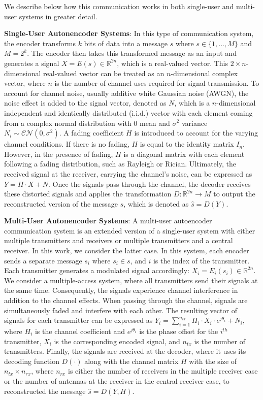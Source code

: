 We describe below how this communication works in both single-user and multi-user systems in greater detail.

\textbf{Single-User Autonencoder Systems}: In this type of communication system, the encoder transforms \(k\) bits of data into a message \(s\) where \(s \in \{1,...,M\}\) and \(M = 2^k\). The encoder then takes this transformed message as an input and generates a signal \(X = E(s) \in \mathbb{R}^{2n}\), which is a real-valued vector. This \(2 \times n\)-dimensional real-valued vector can be treated as an \(n\)-dimensional complex vector, where \(n\) is the number of channel uses required for signal transmission. To account for channel noise, usually additive white Gaussian noise (AWGN), the noise effect is added to the signal vector, denoted as \(N\), which is a \(n\)-dimensional independent and identically distributed (i.i.d.) vector with each element coming from a complex normal distribution with 0 mean and \(\sigma^2\) variance \(N_i \sim \mathcal{CN}(0, \sigma^2)\). A fading coefficient \(H\) is introduced to account for the varying channel conditions. If there is no fading, \(H\) is equal to the identity matrix \(I_n\). However, in the presence of fading, \(H\) is a diagonal matrix with each element following a fading distribution, such as Rayleigh or Rician. Ultimately, the received signal at the receiver, carrying the channel's noise, can be expressed as \(Y = H \cdot X + N\). Once the signals pass through the channel, the decoder receives these distorted signals and applies the transformation \(D: \mathbb{R}^{2n} \rightarrow M \) to output the reconstructed version of the message \(s\), which is  denoted as \(\hat{s} = D(Y)\).

\textbf{Multi-User Autonencoder Systems}: A multi-user autoencoder communication system is an extended version of a single-user system with either multiple transmitters and receivers or multiple transmitters and a central receiver. In this work, we consider the latter case. In this system, each encoder sends a separate message \(s_i\) where \(s_i \in s\), and \(i\) is the index of the transmitter. Each transmitter generates a modulated signal accordingly: \(X_i = E_i(s_i) \in \mathbb{R}^{2n}\). We consider a multiple-access system, where all transmitters send their signals at the same time. Consequently, the signals experience channel interference in addition to the channel effects. When passing through the channel, signals are simultaneously faded and interfere with each other. The resulting vector of signals for each transmitter can be expressed as \(Y_i = \sum_{i=1}^{n_{tx}} H_i \cdot X_i \cdot e^{j\theta_i} + N_i\), where \(H_i\) is the channel coefficient and \(e^{j\theta_i}\) is the phase offset for the \(i^{th}\) transmitter, \(X_i\) is the corresponding encoded signal, and \(n_{tx}\) is the number of transmitters. Finally, the signals are received at the decoder, where it uses its decoding function \(D(\cdot)\) along with the channel matrix \(H\) with the size of \(n_{tx} \times n_{rx}\), where \(n_{rx}\) is either the number of receivers in the multiple receiver case or the number of antennas at the receiver in the central receiver case, to reconstructed the message \(\hat{s} = D(Y, H)\).
